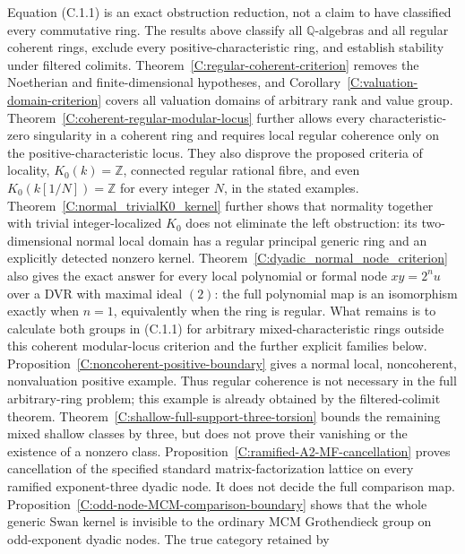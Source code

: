 \begin{remark}
\label{C:allrings_open}\label{C:allrings_gate}
Equation (C.1.1) is an exact obstruction reduction, not a claim to have
classified every commutative ring. The results above classify all
$\mathbb Q$-algebras and all regular coherent rings, exclude every
positive-characteristic ring, and establish stability under filtered
colimits. Theorem~\ref{C:regular-coherent-criterion} removes the
Noetherian and finite-dimensional hypotheses, and
Corollary~\ref{C:valuation-domain-criterion} covers all valuation
domains of arbitrary rank and value group.
Theorem~\ref{C:coherent-regular-modular-locus} further allows every
characteristic-zero singularity in a coherent ring and requires local
regular coherence only on the positive-characteristic locus. They also disprove the proposed criteria of locality,
$K_0(k)=\mathbb Z$, connected regular rational fibre, and even
$K_0(k[1/N])=\mathbb Z$ for every integer $N$, in the stated examples.
Theorem~\ref{C:normal_trivialK0_kernel} further shows that normality together with trivial integer-localized $K_0$ does not eliminate the left obstruction: its two-dimensional normal local domain has a regular principal generic ring and an explicitly detected nonzero kernel. Theorem~\ref{C:dyadic_normal_node_criterion} also gives the exact answer for every local polynomial or formal node $xy=2^n u$ over a DVR with maximal ideal $(2)$: the full polynomial map is an isomorphism exactly when $n=1$, equivalently when the ring is regular. What remains is to calculate both groups in (C.1.1) for arbitrary
mixed-characteristic rings outside this coherent modular-locus
criterion and the further explicit families below.
Proposition~\ref{C:noncoherent-positive-boundary} gives a normal local,
noncoherent, nonvaluation positive example. Thus regular coherence is
not necessary in the full arbitrary-ring problem; this example is
already obtained by the filtered-colimit theorem.
Theorem~\ref{C:shallow-full-support-three-torsion} bounds the remaining
mixed shallow classes by three, but does not prove their vanishing
or the existence of a nonzero class.
Proposition~\ref{C:ramified-A2-MF-cancellation} proves cancellation
of the specified standard matrix-factorization lattice on every ramified
exponent-three dyadic node. It does not decide the full comparison map.
Proposition~\ref{C:odd-node-MCM-comparison-boundary} shows that the
whole generic Swan kernel is invisible to the ordinary MCM Grothendieck
group on odd-exponent dyadic nodes. The true category retained by

\end{remark}
